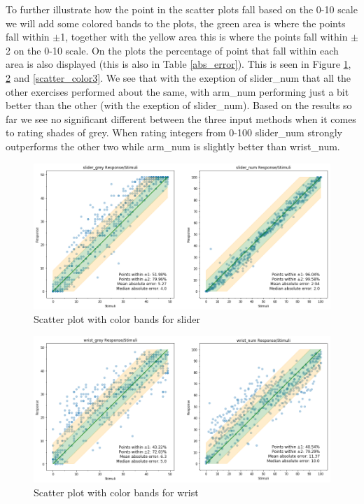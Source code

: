 To further illustrate how the point in the scatter plots fall based on the 0-10 scale we will add some colored bands to the plots, the green area is where the points fall within $\pm$1, together with the yellow area this is where the points fall within $\pm$2 on the 0-10 scale. On the plots the percentage of point that fall within each area is also displayed (this is also in Table \ref{abs_error}). This is seen in Figure \ref{scatter_color1}, \ref{scatter_color2} and \ref{scatter_color3}. We see that with the exeption of slider\_num that all the other exercises performed about the same, with arm\_num performing just a bit better than the other (with the exeption of slider\_num). Based on the results so far we see no significant different between the three input methods when it comes to rating shades of grey. When rating integers from 0-100 slider\_num strongly outperforms the other two while arm\_num is slightly better than wrist\_num.

\begin{figure}[p]
    \centering
    \includegraphics[width=1.15\textwidth]{figures/scatter_col1.png}
    \caption{Scatter plot with color bands for slider}
    \label{scatter_color1}
\end{figure}

\begin{figure}[p]
    \centering
    \includegraphics[width=1.15\textwidth]{figures/scatter_col2.png}
    \caption{Scatter plot with color bands for wrist}
    \label{scatter_color2}
\end{figure}

